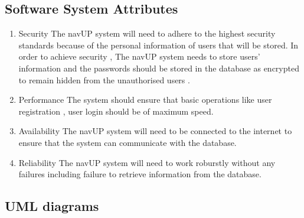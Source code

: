 \subsection{Software System Attributes}
\begin{enumerate}
	\item Security
	\newline
	The navUP system will need to adhere to the highest security standards because of the personal information of users that will be stored. In order to achieve security , The navUP system needs to store users’ information and the passwords should be stored in the database as encrypted to remain hidden from the unauthorised users  .
	\item Performance
	\newline
	The system should ensure that basic operations like user registration , user login should be of maximum speed. 
	\item Availability
	\newline
	The navUP system will need to be connected to the internet to ensure that the system can communicate with  the database.
	\item Reliability
	\newline
	The navUP system will need to work roburstly without any failures including failure to retrieve information from the database.
\end{enumerate}
\subsection{UML diagrams}
